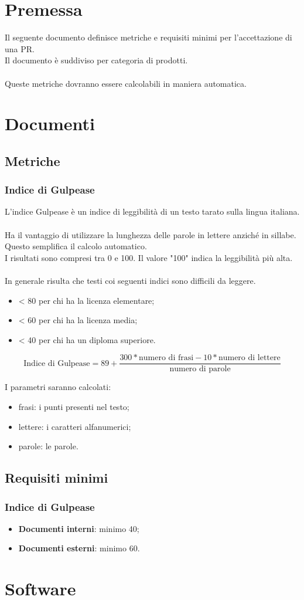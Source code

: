 \documentclass[a4paper, 12pt]{article}
\begin{document}
\makefrontpage

\makeversioni

\section{Premessa}
Il seguente documento definisce metriche e requisiti minimi per l'accettazione di una PR.\\
Il documento è suddiviso per categoria di prodotti.\\\\
Queste metriche dovranno essere calcolabili in maniera automatica.
\section{Documenti}
\subsection{Metriche}
\subsubsection{Indice di Gulpease}
L'indice Gulpease è un indice di leggibilità di un testo tarato sulla lingua italiana.\\\\
Ha il vantaggio di utilizzare la lunghezza delle parole in lettere anziché in sillabe.\\
Questo semplifica il calcolo automatico.\\
I risultati sono compresi tra 0 e 100. Il valore "100" indica la leggibilità più alta.\\\\
In generale risulta che testi coi seguenti indici sono difficili da leggere.
\begin{itemize}
    \item < 80 per chi ha la licenza elementare;
    \item < 60 per chi ha la licenza media;
    \item < 40 per chi ha un diploma superiore.
\end{itemize}

\[ \text{Indice di Gulpease} = 89 + \frac{300*\text{numero di frasi} - 10*\text{numero di lettere}}{\text{numero di parole}} \]

I parametri saranno calcolati:
\begin{itemize}
	\item frasi: i punti presenti nel testo;
	\item lettere: i caratteri alfanumerici;
	\item parole: le parole.
\end{itemize}

\subsection{Requisiti minimi}
\subsubsection{Indice di Gulpease}
\begin{itemize}
	\item \textbf{Documenti interni}: minimo 40;
	\item \textbf{Documenti esterni}: minimo 60.
\end{itemize}

\section{Software}
\end{document}
